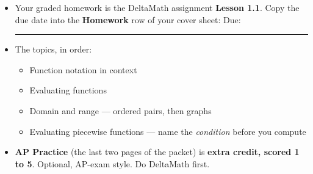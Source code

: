 \documentclass[aspectratio=169, 11pt]{beamer}
\begin{document}
\begin{frame}[t, plain]

  \begin{itemize}\setlength{\itemsep}{8pt}
    \item Your graded homework is the DeltaMath assignment \textbf{Lesson 1.1}.
          Copy the due date into the \textbf{Homework} row of your cover sheet:
          \quad Due: \rule{3cm}{0.4pt}
    \item The topics, in order:
          \begin{itemize}\setlength{\itemsep}{2pt}
            \item Function notation in context
            \item Evaluating functions
            \item Domain and range --- ordered pairs, then graphs
            \item Evaluating piecewise functions --- name the \textit{condition}
                  before you compute
          \end{itemize}
    \item \textbf{AP Practice} (the last two pages of the packet) is
          \textbf{extra credit, scored 1 to 5}. Optional, AP-exam style. Do DeltaMath first.
  \end{itemize}
\end{frame}
\end{document}
